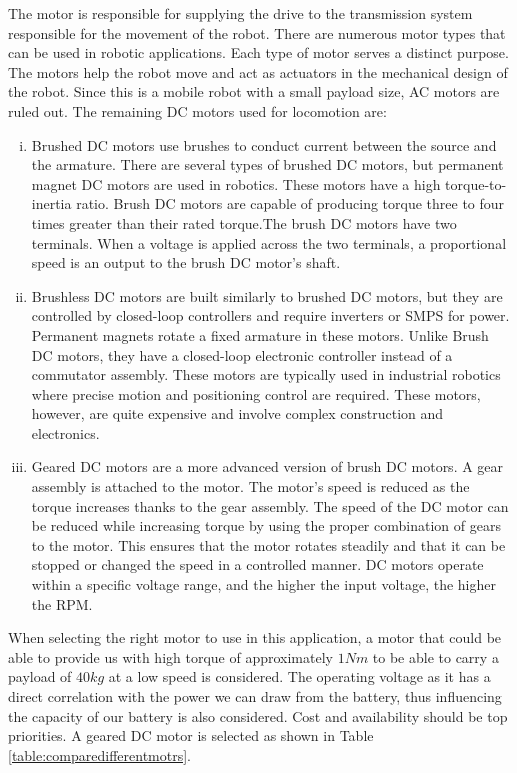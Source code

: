 The motor is responsible for supplying the drive to the transmission system responsible for the movement of the robot. There are numerous motor types that can be used in robotic applications. Each type of motor serves a distinct purpose. The motors help the robot move and act as actuators in the mechanical design of the robot. Since this is a mobile robot with a small payload size, \ac{AC} motors are ruled out. The remaining \ac{DC} motors used for locomotion are:
\begin{enumerate}[i.]
    \item Brushed \ac{DC} motors use brushes to conduct current between the source and the armature. There are several types of brushed \ac{DC} motors, but permanent magnet \ac{DC} motors are used in robotics. These motors have a high torque-to-inertia ratio. Brush \ac{DC} motors are capable of producing torque three to four times greater than their rated torque.The brush \ac{DC} motors have two terminals. When a voltage is applied across the two terminals, a proportional speed is an output to the brush \ac{DC} motor's shaft.

    \item Brushless \ac{DC} motors are built similarly to brushed \ac{DC} motors, but they are controlled by closed-loop controllers and require inverters or \ac{SMPS} for power. Permanent magnets rotate a fixed armature in these motors. Unlike Brush \ac{DC} motors, they have a closed-loop electronic controller instead of a commutator assembly. These motors are typically used in industrial robotics where precise motion and positioning control are required. These motors, however, are quite expensive and involve complex construction and electronics.

    \item Geared \ac{DC} motors are a more advanced version of brush \ac{DC} motors. A gear assembly is attached to the motor. The motor's speed is reduced as the torque increases thanks to the gear assembly. The speed of the \ac{DC} motor can be reduced while increasing torque by using the proper combination of gears to the motor. This ensures that the motor rotates steadily and that it can be stopped or changed the speed in a controlled manner. \ac{DC} motors operate within a specific voltage range, and the higher the input voltage, the higher the \ac{RPM}.
\end{enumerate}

When selecting the right motor to use in this application, a motor that could be able to provide us with high torque of approximately $1 Nm$ to be able to carry a payload of $40 kg$ at a low speed is considered. The operating voltage as it has a direct correlation with the power we can draw from the battery, thus influencing the capacity of our battery is also considered. Cost and availability should be top priorities. A geared \ac{DC} motor is selected as shown in Table \ref{table:comparedifferentmotrs}.

